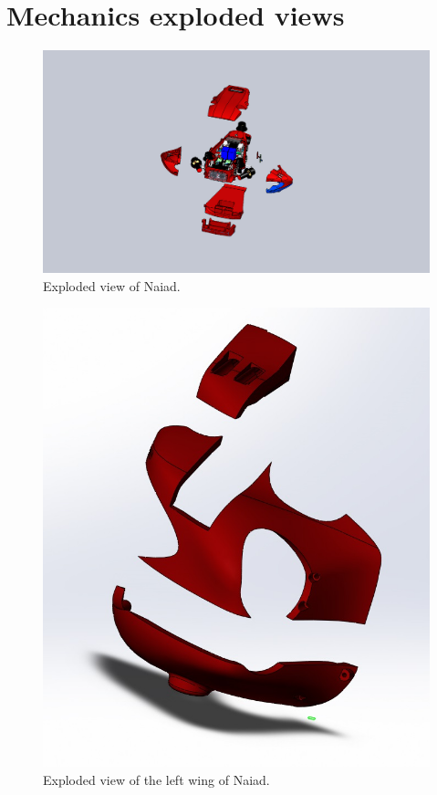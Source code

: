 \section{Mechanics exploded views}

\begin{figure}[!ht]
	\begin{center}
		\includegraphics[width=150mm]{./Images/Mechanics/ExplodedView.jpg}
		\caption{Exploded view of Naiad.}
		\label{hoj}
	\end{center}
\end{figure}

\begin{figure}[!ht]
	\begin{center}
		\includegraphics[width=150mm]{./Images/Mechanics/ExplodedLeftWing.jpg}
		\caption{Exploded view of the left wing of Naiad.}
		\label{troll}
	\end{center}
\end{figure}